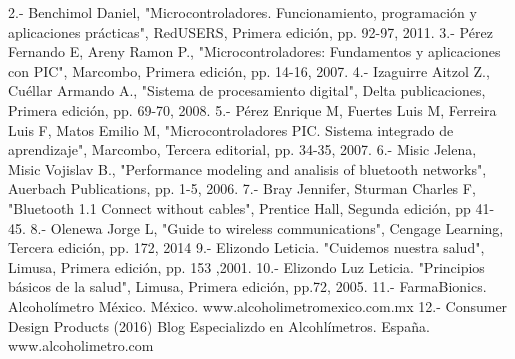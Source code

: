 2.- Benchimol Daniel, "Microcontroladores. Funcionamiento, programación y aplicaciones prácticas", RedUSERS, Primera edición, pp. 92-97, 2011.
3.- Pérez Fernando E, Areny Ramon P., "Microcontroladores: Fundamentos y aplicaciones con PIC", Marcombo, Primera edición, pp. 14-16, 2007.
4.- Izaguirre Aitzol Z., Cuéllar Armando A., "Sistema de procesamiento digital", Delta publicaciones, Primera edición, pp. 69-70, 2008.
5.- Pérez Enrique M, Fuertes Luis M, Ferreira Luis F, Matos Emilio M, "Microcontroladores PIC. Sistema integrado de aprendizaje", Marcombo, Tercera editorial, pp. 34-35, 2007.
6.- Misic Jelena, Misic Vojislav B., "Performance modeling and analisis of bluetooth networks", Auerbach Publications, pp. 1-5, 2006.
7.- Bray Jennifer, Sturman Charles F, "Bluetooth 1.1 Connect without cables", Prentice Hall, Segunda edición, pp 41-45.
8.- Olenewa Jorge L, "Guide to wireless communications", Cengage Learning, Tercera edición, pp. 172, 2014
9.- Elizondo Leticia. "Cuidemos nuestra salud", Limusa, Primera edición, pp. 153 ,2001.
10.- Elizondo Luz Leticia. "Principios básicos de la salud", Limusa, Primera edición, pp.72, 2005.
11.- FarmaBionics. Alcoholímetro México. México.  www.alcoholimetromexico.com.mx
12.- Consumer Design Products (2016) Blog Especializdo en Alcohlímetros. España. www.alcoholimetro.com

